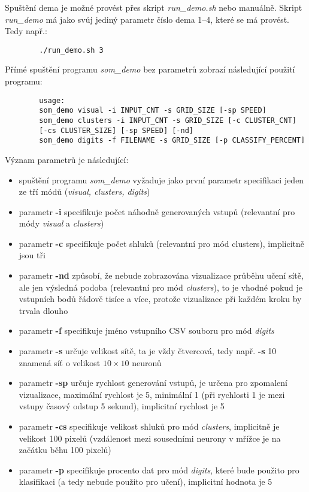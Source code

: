 \documentclass[11pt]{article}
\begin{document}
Spuštění dema je možné provést přes skript \textit{run\_demo.sh} nebo manuálně. Skript \textit{run\_demo} má jako svůj jediný parametr číslo dema 1--4, které se má provést. Tedy např.:

\begin{commandline}
	\begin{verbatim}
		./run_demo.sh 3
	\end{verbatim}
\end{commandline}

Přímé spuštění programu \textit{som\_demo} bez parametrů zobrazí následující použití programu:

\begin{commandline}
	\begin{verbatim}
		usage:
		som_demo visual -i INPUT_CNT -s GRID_SIZE [-sp SPEED]
		som_demo clusters -i INPUT_CNT -s GRID_SIZE [-c CLUSTER_CNT] 
		[-cs CLUSTER_SIZE] [-sp SPEED] [-nd]
		som_demo digits -f FILENAME -s GRID_SIZE [-p CLASSIFY_PERCENT]
	\end{verbatim}
\end{commandline}

Význam parametrů je následující:

\begin{itemize}
	\item spuštění programu \textit{som\_demo} vyžaduje jako první parametr specifikaci jeden ze tří módů (\textit{visual, clusters, digits})
	\item parametr \textbf{-i} specifikuje počet náhodně generovaných vstupů (relevantní pro módy \textit{visual} a \textit{clusters})
	\item parametr \textbf{-c} specifikuje počet shluků (relevantní pro mód clusters), implicitně jsou tři
	\item parametr \textbf{-nd} způsobí, že nebude zobrazována vizualizace průběhu učení sítě, ale jen výsledná podoba (relevantní pro mód \textit{clusters}), to je vhodné pokud je vstupních bodů řádově tisíce a více, protože vizualizace při každém kroku by trvala dlouho
	\item parametr \textbf{-f} specifikuje jméno vstupního CSV souboru pro mód \textit{digits}
	\item parametr \textbf{-s} určuje velikost sítě, ta je vždy čtvercová, tedy např. \textbf{-s} 10 znamená síť o velikost $10\times10$ neuronů
	\item parametr \textbf{-sp} určuje rychlost generování vstupů, je určena pro zpomalení vizualizace, maximální rychlost je 5, minimální 1 (při rychlosti 1 je mezi vstupy časový odstup 5 sekund), implicitní rychlost je 5
	\item parametr \textbf{-cs} specifikuje velikost shluků pro mód \textit{clusters}, implicitně je velikost 100 pixelů (vzdálenost mezi sousedními neurony v mřížce je na začátku běhu 100 pixelů)
	\item parametr \textbf{-p} specifikuje procento dat pro mód \textit{digits}, které bude použito pro klasifikaci (a tedy nebude použito pro učení), implicitní hodnota je 5
\end{itemize}
\end{document}
